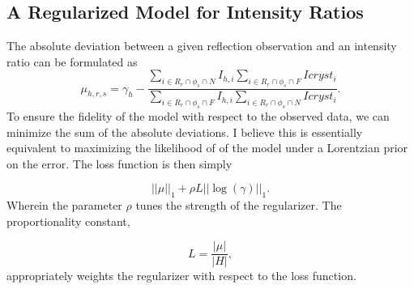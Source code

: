 \documentclass{report}
\begin{document}
\subsection{A Regularized Model for Intensity Ratios}

The absolute deviation between a given reflection observation and an intensity ratio can be formulated as
\begin{equation}\label{eq:reflection_error}
\mu_{h,r,s} = \gamma_h  - \frac {\sum_{i\in R_r \cap \phi_s \cap N} I_{h,i} \sum_{i \in R_r \cap \phi_s \cap F} Icryst_i} {\sum_{i\in R_r \cap \phi_s \cap F} I_{h,i} \sum_{i \in R_r \cap \phi_s \cap N} Icryst_i}.
\end{equation}
To ensure the fidelity of the model with respect to the observed data, we can minimize the sum of the absolute deviations. 
I believe this is essentially equivalent to maximizing the likelihood of of the model under a Lorentzian prior on the error. 
The loss function is then simply 

\begin{equation}
|| \mu ||_1 + \rho L ||\log(\gamma)||_1.
\end{equation}
Wherein the parameter $\rho$ tunes the strength of the regularizer. The proportionality constant, 

\begin{equation}
L = \frac {|\mu|} {|H|},
\end{equation}
appropriately weights the regularizer with respect to the loss function.



\end{document}
